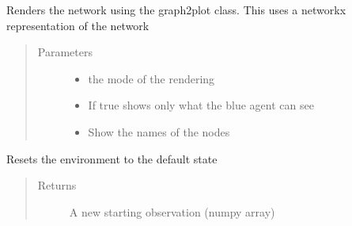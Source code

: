 \documentclass[letterpaper,10pt,english]{sphinxmanual}
\begin{document}
\begin{fulllineitems}
\begin{fulllineitems}
\label{\detokenize{source/yawning_titan.envs.generic:yawning_titan.envs.generic.generic_env.GenericNetworkEnv.render}}
\sphinxAtStartPar
Renders the network using the graph2plot class. This uses a networkx representation of the network
\begin{quote}\begin{description}
\item[{Parameters}] \leavevmode\begin{itemize}
\item {}
\sphinxAtStartPar
{} \textendash{} the mode of the rendering

\item {}
\sphinxAtStartPar
{} \textendash{} If true shows only what the blue agent can see

\item {}
\sphinxAtStartPar
{} \textendash{} Show the names of the nodes

\end{itemize}

\end{description}\end{quote}

\end{fulllineitems}


\begin{fulllineitems}
\label{\detokenize{source/yawning_titan.envs.generic:yawning_titan.envs.generic.generic_env.GenericNetworkEnv.reset}}
\sphinxAtStartPar
Resets the environment to the default state
\begin{quote}\begin{description}
\item[{Returns}] \leavevmode
\sphinxAtStartPar
A new starting observation (numpy array)


\end{description}
\end{quote}
\end{fulllineitems}
\end{fulllineitems}
\end{document}
